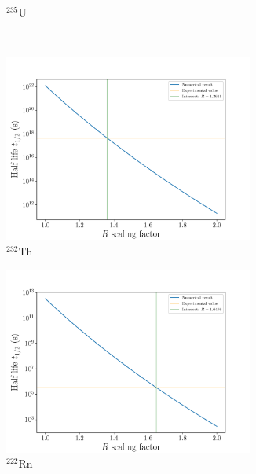 \documentclass[a4paper,DIV=12,english]{scrartcl}
\begin{document}
\begin{figure}
\begin{subfigure}{0.49\textwidth}
        \caption{$^{235}\text{U}$}
        \label{subfig:r_u235}
    \end{subfigure}\\
    \begin{subfigure}{0.49\textwidth}
        \centering
        \includegraphics[width=0.9\textwidth]{../plots/R_dependence/R_th232.pdf}
        \caption{$^{232}\text{Th}$}
        \label{subfig:r_th232}
    \end{subfigure}
    \begin{subfigure}{0.49\textwidth}
        \centering
        \includegraphics[width=0.9\textwidth]{../plots/R_dependence/R_rn222.pdf}
        \caption{$^{222}\text{Rn}$}
        \label{subfig:r_rn222}
    \end{subfigure}\\
    \begin{subfigure}{0.49\textwidth}
        \centering

\end{subfigure}
\end{figure}
\end{document}

